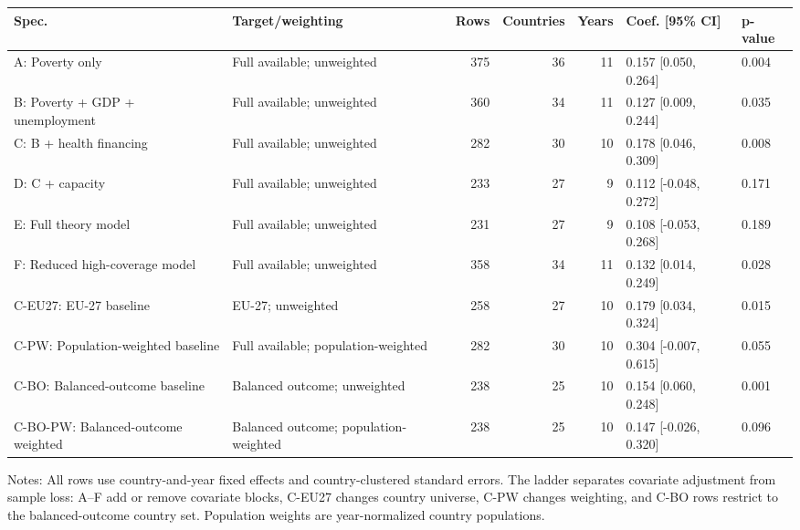 \begingroup
\scriptsize
\setlength{\tabcolsep}{3pt}
\renewcommand{\arraystretch}{1.12}
\begin{tabularx}{\textwidth}{@{}p{}Yrrrp{0.20\textwidth}l@{}}
\toprule
Spec. & Target/weighting & Rows & Countries & Years & Coef. [95\% CI] & p-value \\
\midrule
A: Poverty only & Full available; unweighted & 375 & 36 & 11 & 0.157 [0.050, 0.264] & 0.004 \\
B: Poverty + GDP + unemployment & Full available; unweighted & 360 & 34 & 11 & 0.127 [0.009, 0.244] & 0.035 \\
C: B + health financing & Full available; unweighted & 282 & 30 & 10 & 0.178 [0.046, 0.309] & 0.008 \\
D: C + capacity & Full available; unweighted & 233 & 27 & 9 & 0.112 [-0.048, 0.272] & 0.171 \\
E: Full theory model & Full available; unweighted & 231 & 27 & 9 & 0.108 [-0.053, 0.268] & 0.189 \\
F: Reduced high-coverage model & Full available; unweighted & 358 & 34 & 11 & 0.132 [0.014, 0.249] & 0.028 \\
C-EU27: EU-27 baseline & EU-27; unweighted & 258 & 27 & 10 & 0.179 [0.034, 0.324] & 0.015 \\
C-PW: Population-weighted baseline & Full available; population-weighted & 282 & 30 & 10 & 0.304 [-0.007, 0.615] & 0.055 \\
C-BO: Balanced-outcome baseline & Balanced outcome; unweighted & 238 & 25 & 10 & 0.154 [0.060, 0.248] & 0.001 \\
C-BO-PW: Balanced-outcome weighted & Balanced outcome; population-weighted & 238 & 25 & 10 & 0.147 [-0.026, 0.320] & 0.096 \\
\bottomrule
\end{tabularx}

\vspace{0.2em}
\begin{minipage}{0.94\textwidth}\scriptsize Notes: All rows use country-and-year fixed effects and country-clustered standard errors. The ladder separates covariate adjustment from sample loss: A--F add or remove covariate blocks, C-EU27 changes country universe, C-PW changes weighting, and C-BO rows restrict to the balanced-outcome country set. Population weights are year-normalized country populations.\end{minipage}
\endgroup
